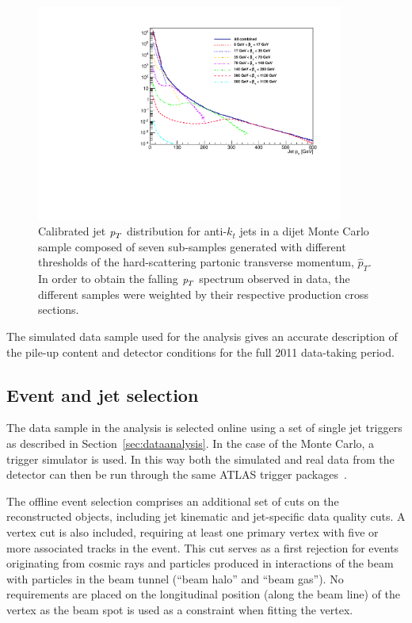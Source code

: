 \begin{figure}[tp]
\centering
\includegraphics[width=0.9\textwidth]{JXspectrum.pdf}
\caption{Calibrated jet ${\emph{p}_{T}}$ distribution for anti-$k_t$ jets in a dijet Monte Carlo sample composed of seven sub-samples generated with different thresholds of the hard-scattering partonic transverse momentum, $\hat{p}_T$. In order to obtain the falling ${\emph{p}_{T}}$ spectrum observed in data, the different samples were weighted by their respective production cross sections.}
\label{fig:JXpt}
\end{figure}

The simulated data sample used for the analysis %
gives an accurate description of the pile-up content and detector conditions for the full 2011 data-taking period. 



\subsection{Event and jet selection}\label{sec:EventSelection}

The data sample in the analysis is selected online using a set of single jet triggers as described in Section~\ref{sec:dataanalysis}. In the case of the Monte Carlo, a trigger simulator is used. In this way both the simulated and real data from the detector can then be run through the same ATLAS trigger packages~\cite{ATLASTriggerSimulation}.

The offline event selection comprises an additional set of cuts on the reconstructed objects, including jet kinematic and jet-specific data quality cuts. A vertex cut is also included, requiring at least one primary vertex with five or more associated tracks in the event.  This cut serves as a first rejection for events originating from cosmic rays and particles produced in interactions of the beam with particles in the beam tunnel (``beam halo'' and ``beam gas'').
No requirements are placed on the longitudinal position (along the beam line) of the vertex as the beam spot is used as a constraint when fitting the vertex. 


